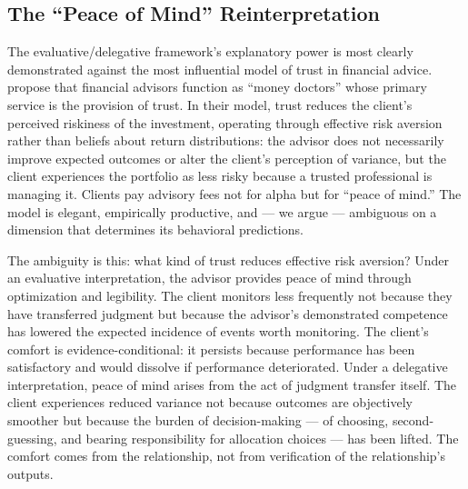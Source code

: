 
\subsection{The ``Peace of Mind'' Reinterpretation}
\label{subsec:peace_of_mind}

The evaluative/delegative framework's explanatory power is most clearly demonstrated against the most influential model of trust in financial advice. \citet{GennaioliShleiferVishny2015} propose that financial advisors function as ``money doctors'' whose primary service is the provision of trust. In their model, trust reduces the client's perceived riskiness of the investment, operating through effective risk aversion rather than beliefs about return distributions: the advisor does not necessarily improve expected outcomes or alter the client's perception of variance, but the client experiences the portfolio as less risky because a trusted professional is managing it. Clients pay advisory fees not for alpha but for ``peace of mind.'' The model is elegant, empirically productive, and --- we argue --- ambiguous on a dimension that determines its behavioral predictions.

The ambiguity is this: what kind of trust reduces effective risk aversion? Under an evaluative interpretation, the advisor provides peace of mind through optimization and legibility. The client monitors less frequently not because they have transferred judgment but because the advisor's demonstrated competence has lowered the expected incidence of events worth monitoring. The client's comfort is evidence-conditional: it persists because performance has been satisfactory and would dissolve if performance deteriorated. Under a delegative interpretation, peace of mind arises from the act of judgment transfer itself. The client experiences reduced variance not because outcomes are objectively smoother but because the burden of decision-making --- of choosing, second-guessing, and bearing responsibility for allocation choices --- has been lifted. The comfort comes from the relationship, not from verification of the relationship's outputs.

